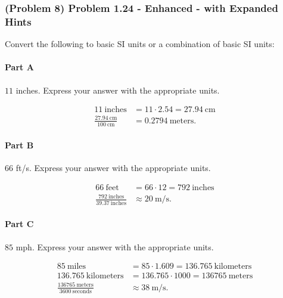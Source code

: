 \newpage

\subsubsection{(Problem 8) Problem 1.24 - Enhanced - with Expanded Hints}

Convert the following to basic SI units or a combination of basic SI units:

\paragraph{Part A}

$11$ inches. Express your answer with the appropriate units.

\begin{solution}
	\begin{align*}
		11~\text{inches} &= 11 \cdot 2.54 = 27.94~\text{cm} \\
		\frac{27.94~\text{cm}}{100~\text{cm}} &= 0.2794~\text{meters}
		.\end{align*}
\end{solution}

\paragraph{Part B}

$66$ ft/s. Express your answer with the appropriate units.

\vspace{1em}

\begin{solution}
	\begin{align*}
		66~\text{feet} &= 66 \cdot 12 = 792~\text{inches} \\
		\frac{792~\text{inches}}{39.37~\text{inches}} &\approx 20~\text{m/s}
		.\end{align*}
\end{solution}

\paragraph{Part C}

$85$ mph. Express your answer with the appropriate units.

\vspace{1em}

\begin{solution}
	\begin{align*}
		85~\text{miles} &= 85 \cdot 1.609 = 136.765~\text{kilometers} \\
		136.765~\text{kilometers} &= 136.765 \cdot 1000 = 136765~\text{meters} \\
		\frac{136765~\text{meters}}{3600~\text{seconds}} &\approx 38~\text{m/s}
		.\end{align*}
\end{solution}


